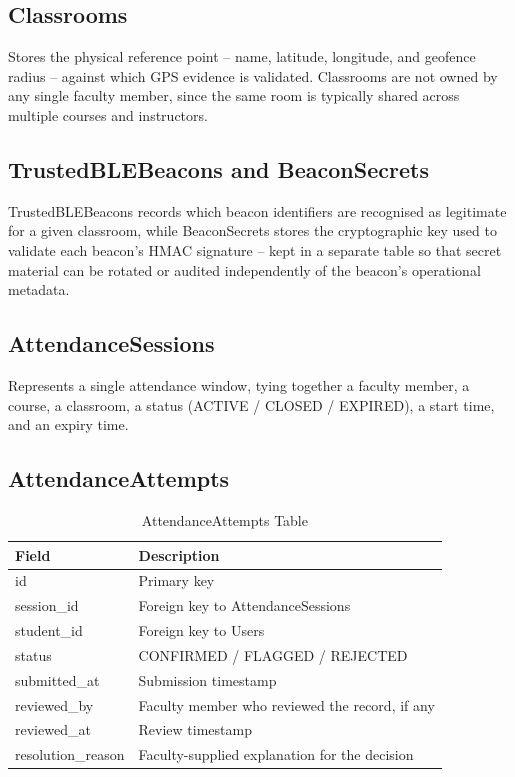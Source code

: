 \documentclass[12pt, a4paper, oneside]{report}
\begin{document}
\subsection{Classrooms}
Stores the physical reference point -- name, latitude, longitude, and geofence radius -- against which GPS evidence is validated. Classrooms are not owned by any single faculty member, since the same room is typically shared across multiple courses and instructors.

\subsection{TrustedBLEBeacons and BeaconSecrets}
TrustedBLEBeacons records which beacon identifiers are recognised as legitimate for a given classroom, while BeaconSecrets stores the cryptographic key used to validate each beacon's HMAC signature -- kept in a separate table so that secret material can be rotated or audited independently of the beacon's operational metadata.

\subsection{AttendanceSessions}
Represents a single attendance window, tying together a faculty member, a course, a classroom, a status (ACTIVE / CLOSED / EXPIRED), a start time, and an expiry time.

\subsection{AttendanceAttempts}

\begin{table}[htbp]
\centering
\caption{AttendanceAttempts Table}
\label{tab:attendance-attempts}
\begin{tabularx}{\textwidth}{|l|X|}
\hline
\textbf{Field} & \textbf{Description} \\
\hline
id & Primary key \\
\hline
session\_id & Foreign key to AttendanceSessions \\
\hline
student\_id & Foreign key to Users \\
\hline
status & CONFIRMED / FLAGGED / REJECTED \\
\hline
submitted\_at & Submission timestamp \\
\hline
reviewed\_by & Faculty member who reviewed the record, if any \\
\hline
reviewed\_at & Review timestamp \\
\hline
resolution\_reason & Faculty-supplied explanation for the decision \\
\hline
\end{tabularx}
\end{table}
\end{document}
